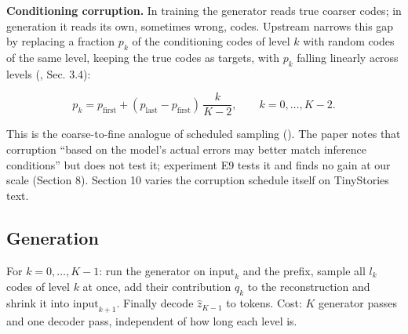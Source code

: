 \documentclass[
  british,
]{article}
\begin{document}
\textbf{Conditioning corruption.} In training the generator reads true
coarser codes; in generation it reads its own, sometimes wrong, codes.
Upstream narrows this gap by replacing a fraction \(p_k\) of the
conditioning codes of level \(k\) with random codes of the same level,
keeping the true codes as targets, with \(p_k\) falling linearly across
levels (, Sec. 3.4):

\[p_k = p_{\mathrm{first}} + (p_{\mathrm{last}} - p_{\mathrm{first}})\,\frac{k}{K-2}, \qquad k = 0, \dots, K-2 .\]

This is the coarse-to-fine analogue of scheduled sampling
(). The paper notes that
corruption ``based on the model's actual errors may better match
inference conditions'' but does not test it; experiment E9 tests it and
finds no gain at our scale (Section 8). Section 10 varies the corruption
schedule itself on TinyStories text.

\subsection{Generation}\label{generation}

For \(k = 0, \dots, K-1\): run the generator on \(\mathrm{input}_k\) and
the prefix, sample all \(l_k\) codes of level \(k\) at once, add their
contribution \(q_k\) to the reconstruction and shrink it into
\(\mathrm{input}_{k+1}\). Finally decode \(\hat z_{K-1}\) to tokens.
Cost: \(K\) generator passes and one decoder pass, independent of how
long each level is.
\end{document}
